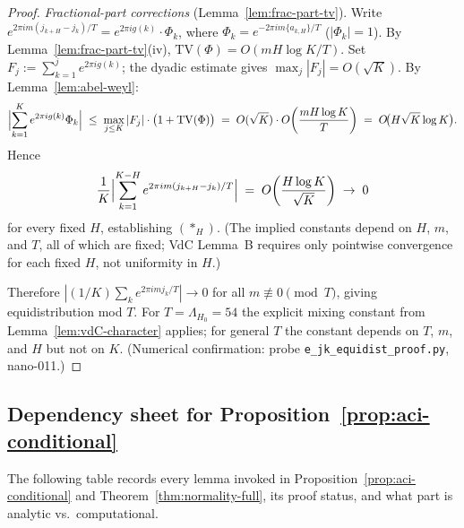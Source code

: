 \documentclass[
]{article}
\begin{document}
\begin{proof}
\emph{Fractional-part corrections} (Lemma~\ref{lem:frac-part-tv}).
Write $e^{2\pi im(j_{k+H}-j_k)/T}=e^{2\pi ig(k)}\cdot\Phi_k$,
where $\Phi_k=e^{-2\pi im\{a_{k,H}\}/T}$ ($|\Phi_k|=1$).
By Lemma~\ref{lem:frac-part-tv}(iv), $\mathrm{TV}(\Phi)=O(mH\log K/T)$.
Set $F_j:=\sum_{k=1}^j e^{2\pi ig(k)}$; the dyadic estimate gives
$\max_j|F_j|=O(\sqrt{K})$.
By Lemma~\ref{lem:abel-weyl}:
\[
  \Bigl|\sum_{k=1}^K e^{2\pi ig(k)}\Phi_k\Bigr|
  \;\le\;\max_{j\le K}|F_j|\cdot\bigl(1+\mathrm{TV}(\Phi)\bigr)
  \;=\;O(\sqrt{K})\cdot O\!\left(\frac{mH\log K}{T}\right)
  \;=\;O\!\bigl(H\sqrt{K}\log K\bigr).
\]
Hence
\[
  \frac{1}{K}\Bigl|\sum_{k=1}^{K-H}e^{2\pi im(j_{k+H}-j_k)/T}\Bigr|
  \;=\;O\!\left(\frac{H\log K}{\sqrt{K}}\right)\;\to\;0
\]
for every fixed $H$, establishing $(\ast_H)$.
(The implied constants depend on $H$, $m$, and $T$, all of which are fixed;
VdC Lemma~B requires only pointwise convergence for each fixed $H$,
not uniformity in $H$.)

Therefore $|(1/K)\sum_k e^{2\pi imj_k/T}|\to 0$ for all $m\not\equiv 0\pmod T$,
giving equidistribution mod $T$.
For $T=\Lambda_{H_0}=54$ the explicit mixing constant from
Lemma~\ref{lem:vdC-character} applies; for general $T$ the constant
depends on $T$, $m$, and $H$ but not on $K$.
(Numerical confirmation: probe \texttt{e\_jk\_equidist\_proof.py}, nano-011.)
\end{proof}

\subsection{Dependency sheet for Proposition~\ref{prop:aci-conditional}}
\label{sec:dep-sheet-prop117}

The following table records every lemma invoked in
Proposition~\ref{prop:aci-conditional} and
Theorem~\ref{thm:normality-full}, its proof status, and
what part is analytic vs.\ computational.
\end{document}
